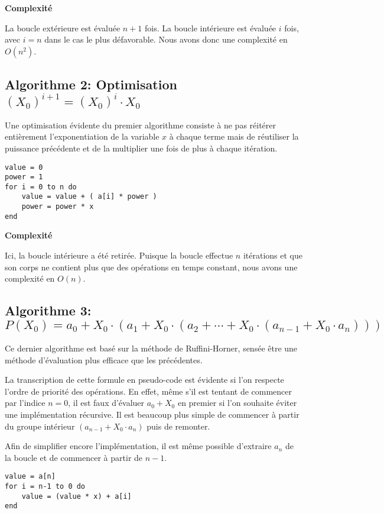 \documentclass[11pt,a4paper]{article}
\begin{document}
\textbf{Complexité}

La boucle extérieure est évaluée $n+1$ fois. La boucle intérieure est évaluée $i$ fois, avec $i = n$ dans le cas le plus défavorable. Nous avons donc une complexité en $O(n^{2})$.

\subsection{Algorithme 2: Optimisation $ (X_{0})^{i+1} = (X_{0})^{i} \cdot X_{0} $}

Une optimisation évidente du premier algorithme consiste à ne pas réitérer entièrement l'exponentiation de la variable $x$ à chaque terme mais de réutiliser la puissance précédente et de la multiplier une fois de plus à chaque itération.

\vspace{1em} \begin{lstlisting}
value = 0
power = 1
for i = 0 to n do
	value = value + ( a[i] * power )
	power = power * x
end
\end{lstlisting}

\textbf{Complexité}

Ici, la boucle intérieure a été retirée. Puisque la boucle effectue $n$ itérations et que son corps ne contient plus que des opérations en temps constant, nous avons une complexité en $O(n)$.

\subsection{Algorithme 3: $ P(X_{0}) = a_{0} + X_{0} \cdot (a_{1} + X_{0} \cdot (a_{2} + \cdots + X_{0} \cdot (a_{n-1} + X_{0} \cdot a_{n}))) $}

Ce dernier algorithme est basé sur la méthode de Ruffini-Horner, sensée être une méthode d'évaluation plus efficace que les précédentes.

La transcription de cette formule en pseudo-code est évidente si l'on respecte l'ordre de priorité des opérations. En effet, même s'il est tentant de commencer par l'indice $n = 0$, il est faux d'évaluer $a_{0} + X_{0}$ en premier si l'on souhaite éviter une implémentation récursive. Il est beaucoup plus simple de commencer à partir du groupe intérieur $(a_{n-1} + X_{0} \cdot a_{n})$ puis de remonter. 

Afin de simplifier encore l'implémentation, il est même possible d'extraire $a_{n}$ de la boucle et de commencer à partir de $n-1$.

\vspace{1em} \begin{lstlisting}
value = a[n]
for i = n-1 to 0 do
	value = (value * x) + a[i]
end
\end{lstlisting}
\end{document}
